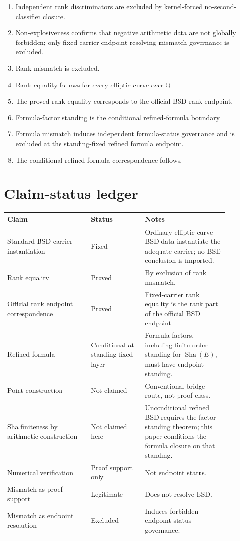 \documentclass[11pt]{article}
\newcommand{\Q}{\mathbb{Q}}
\newcommand{\Sha}{\operatorname{Sha}}
\begin{document}
\begin{enumerate}
\item Independent rank discriminators are excluded by kernel-forced no-second-classifier closure.
\item Non-explosiveness confirms that negative arithmetic data are not globally forbidden; only fixed-carrier endpoint-resolving mismatch governance is excluded.
\item Rank mismatch is excluded.
\item Rank equality follows for every elliptic curve over $\Q$.
\item The proved rank equality corresponds to the official BSD rank endpoint.
\item Formula-factor standing is the conditional refined-formula boundary.
\item Formula mismatch induces independent formula-status governance and is excluded at the standing-fixed refined formula endpoint.
\item The conditional refined formula correspondence follows.
\end{enumerate}

\section{Claim-status ledger}
\begin{longtable}{L{0.34\linewidth}L{0.22\linewidth}L{0.34\linewidth}}
\toprule
\textbf{Claim} & \textbf{Status} & \textbf{Notes}\\
\midrule
Standard BSD carrier instantiation & Fixed & Ordinary elliptic-curve BSD data instantiate the adequate carrier; no BSD conclusion is imported.\\
Rank equality & Proved & By exclusion of rank mismatch.\\
Official rank endpoint correspondence & Proved & Fixed-carrier rank equality is the rank part of the official BSD endpoint.\\
Refined formula & Conditional at standing-fixed layer & Formula factors, including finite-order standing for $\Sha(E)$, must have endpoint standing.\\
Point construction & Not claimed & Conventional bridge route, not proof class.\\
Sha finiteness by arithmetic construction & Not claimed here & Unconditional refined BSD requires the factor-standing theorem; this paper conditions the formula closure on that standing.\\
Numerical verification & Proof support only & Not endpoint status.\\
Mismatch as proof support & Legitimate & Does not resolve BSD.\\
Mismatch as endpoint resolution & Excluded & Induces forbidden endpoint-status governance.\\
\bottomrule
\end{longtable}
\end{document}
